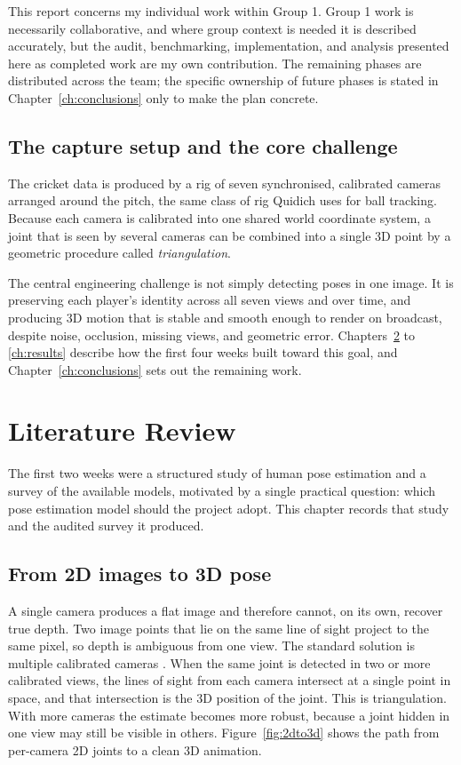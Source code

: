 \documentclass[oneside,openany]{book}
\begin{document}
This report concerns my individual work within Group 1. Group 1 work is necessarily
collaborative, and where group context is needed it is described accurately, but the audit,
benchmarking, implementation, and analysis presented here as completed work are my own
contribution. The remaining phases are distributed across the team; the specific ownership of
future phases is stated in Chapter~\ref{ch:conclusions} only to make the plan concrete.

\section{The capture setup and the core challenge}
The cricket data is produced by a rig of seven synchronised, calibrated cameras arranged around
the pitch, the same class of rig Quidich uses for ball tracking. Because each camera is
calibrated into one shared world coordinate system, a joint that is seen by several cameras can
be combined into a single 3D point by a geometric procedure called \emph{triangulation}.

The central engineering challenge is not simply detecting poses in one image. It is preserving
each player's identity across all seven views and over time, and producing 3D motion that is
stable and smooth enough to render on broadcast, despite noise, occlusion, missing views, and
geometric error. Chapters~\ref{ch:litreview} to \ref{ch:results} describe how the first four
weeks built toward this goal, and Chapter~\ref{ch:conclusions} sets out the remaining work.

\chapter{Literature Review}
\label{ch:litreview}
The first two weeks were a structured study of human pose estimation and a survey of the
available models, motivated by a single practical question: which pose estimation model should
the project adopt. This chapter records that study and the audited survey it produced.

\section{From 2D images to 3D pose}
A single camera produces a flat image and therefore cannot, on its own, recover true depth.
Two image points that lie on the same line of sight project to the same pixel, so depth is
ambiguous from one view. The standard solution is multiple calibrated cameras
\cite{hartley2004multiview}. When the same joint is detected in two or more calibrated views,
the lines of sight from each camera intersect at a single point in space, and that intersection
is the 3D position of the joint. This is triangulation. With more cameras the estimate becomes
more robust, because a joint hidden in one view may still be visible in others.
Figure~\ref{fig:2dto3d} shows the path from per-camera 2D joints to a clean 3D animation.
\end{document}
